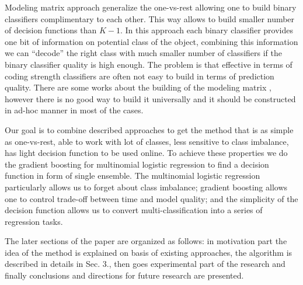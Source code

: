 \documentclass{article}
\begin{document}
Modeling matrix approach generalize the one-vs-rest allowing one to build binary classifiers complimentary to each other. This way allows to build smaller number of decision functions than $K-1$. In this approach each binary classifier provides one bit of information on potential class of the object, combining this information we can ``decode'' the right class with much smaller number of classifiers if the binary classifier quality is high enough. The problem is that effective in terms of coding strength classifiers are often not easy to build in terms of prediction quality. There are some works about the building of the modeling matrix \cite{modelmatrix2,Zhao_sparseoutput}, however there is no good way to build it universally and it should be constructed in ad-hoc manner in most of the cases.

Our goal is to combine described approaches to get the method that is as simple as one-vs-rest, able to work with lot of classes, less sensitive to class imbalance, has light decision function to be used online. To achieve these properties we do the gradient boosting for multinomial logistic regression to find a decision function in form of single ensemble. The multinomial logistic regression particularly allows us to forget about class imbalance; gradient boosting allows one to control trade-off between time and model quality; and the simplicity of the decision function allows us to convert multi-classification into a series of regression tasks.

The later sections of the paper are organized as follows: in motivation part the idea of the method is explained on basis of existing approaches, the algorithm is described in details in Sec. 3., then goes experimental part of the research and finally conclusions and directions for future research are presented.


\end{document}
